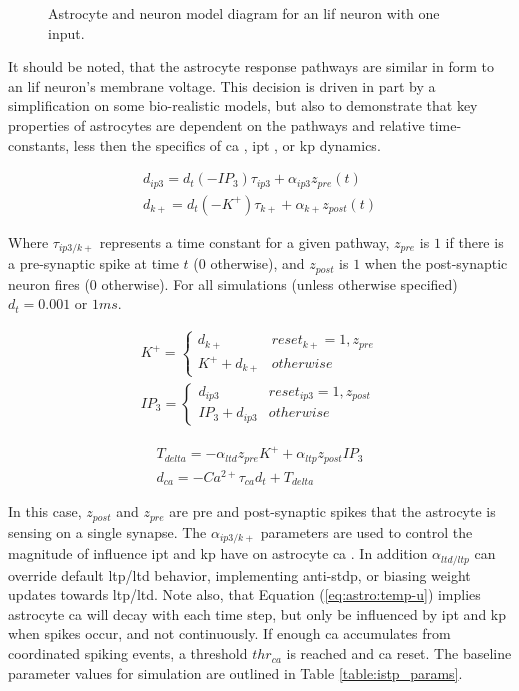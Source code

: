\documentclass[conference]{IEEEtran}
\newcommand{\ca}{\gls{ca}\textrm{ }}
\newcommand{\cam}{Ca^{2+}}
\newcommand{\ipt}{\gls{ipt}\textrm{ }}
\newcommand{\kp}{\gls{kp}\textrm{ }}
\newcommand{\asvgf}[4]{
	\begin{figure}[htbp]
    	\centering
		\adjustbox{max width=#4\linewidth}{}
        \caption{#2.}
        \label{#3}
	\end{figure}
}
\newcommand{\eq}[1]{Equation (\ref{#1})}
\begin{document}
\asvgf{figures/1n1s1a_diagram.svg}{Astrocyte and neuron model diagram for an \gls{lif}
  neuron with one input}{fig:1n1s1a_fn_diagram}{0.9}

It should be noted, that the astrocyte response pathways are similar in form to
an \gls{lif} neuron's membrane voltage. This decision is driven in part by a
simplification on some bio-realistic models, but also to demonstrate that key
properties of astrocytes are dependent on the pathways and relative
time-constants, less then the specifics of \ca, \ipt, or \kp dynamics.

\begin{align}
  d_{ip3} = d_t (-IP_3)\tau_{ip3} + \alpha_{ip3} z_{pre}(t) \label{eq:astro:spike-ip3} \\
  d_{k+} = d_t (-K^+)\tau_{k+} + \alpha_{k+} z_{post}(t) \label{eq:astro:spike-k+}
\end{align}

Where $\tau_{ip3/k+}$ represents a time constant for a given pathway, $z_{pre}$
is $1$ if there is a pre-synaptic spike at time $t$ ($0$ otherwise), and
$z_{post}$ is $1$ when the post-synaptic neuron fires ($0$ otherwise). For all
simulations (unless otherwise specified) $d_t = 0.001$ or $1ms$.

\begin{align}
  K^+ =
  \begin{cases} 
    d_{k+} & reset_{k+} = 1, z_{pre}
    \\ K^+ + d_{k+} & otherwise
  \end{cases} \\
  IP_3 =
  \begin{cases} 
    d_{ip3} & reset_{ip3} = 1, z_{post}
    \\ IP_3 + d_{ip3} & otherwise
  \end{cases}
\end{align}

\begin{align}
T_{delta} = -\alpha_{ltd} z_{pre} K^+ + \alpha_{ltp} z_{post} IP_3\\
d_{ca} = -\cam \tau_{ca} d_t + T_{delta} \label{eq:astro:temp-u}
\end{align}

In this case, $z_{post}$ and $z_{pre}$ are pre and post-synaptic spikes that the
astrocyte is sensing on a single synapse. The $\alpha_{ip3/k+}$ parameters are
used to control the magnitude of influence \ipt and \kp have on astrocyte
\ca. In addition $\alpha_{ltd/ltp}$ can override default \gls{ltp}/\gls{ltd}
behavior, implementing anti-stdp, or biasing weight updates towards
\gls{ltp}/\gls{ltd}. Note also, that \eq{eq:astro:temp-u} implies astrocyte \ca
will decay with each time step, but only be influenced by \ipt and \kp when
spikes occur, and not continuously. If enough \ca accumulates from coordinated
spiking events, a threshold $thr_{ca}$ is reached and \ca reset. The baseline
parameter values for simulation are outlined in Table \ref{table:istp_params}.
\end{document}

